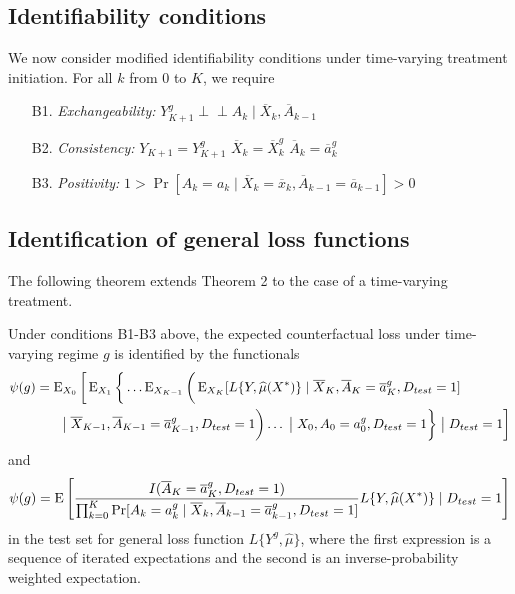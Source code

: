\subsection{Identifiability conditions}
We now consider modified identifiability conditions under time-varying treatment initiation. For all $k$ from 0 to $K$, we require
\begin{enumerate}
    \item[B1.] \textit{Exchangeability:} $Y^g_{K+1} \perp \!\!\! \perp A_k \mid \overline{X}_k, \overline{A}_{k-1}$
    \item[B2.] \textit{Consistency:} $Y_{K+1} = Y^g_{K+1}$ $\overline{X}_{k} = \overline{X}^g_{k}$  $\overline{A}_k = \overline{a}_k^g$
    \item[B3.] \textit{Positivity:} $1 > \Pr[A_k = a_k \mid \overline{X}_k = \overline{x}_k, \overline{A}_{k -1} = \overline{a}_{k-1}] > 0$
\end{enumerate}

\subsection{Identification of general loss functions}
The following theorem extends Theorem 2 to the case of a time-varying treatment. 
\begin{theorem}
    Under conditions B1-B3 above, the expected counterfactual loss under time-varying regime $g$ is identified by the functionals
    \begin{align}\label{eqn:cl_tv_estimand}
    \begin{split}
        \psi(g) &= \operatorname{E}_{X_0}\bigg[\operatorname{E}_{X_1}\bigg\{\ldots \operatorname{E}_{X_{K-1}}\bigg(\operatorname{E}_{X_{K}}[L\{Y, \widehat{\mu}(X^*)\} \mid \overline{X}_K, \overline{A}_K=\overline{a}^g_K, D_{test} = 1] \\
        & \qquad \big\vert\; \overline{X}_{K-1}, \overline{A}_{K-1}=\overline{a}^g_{K-1}, D_{test} = 1\bigg) \ldots \;\big\vert\; X_{0}, A_{0}=a^g_{0}, D_{test} = 1\bigg\}\;\big\vert\; D_{test} = 1\bigg]
    \end{split}
    \end{align}
and 
    \begin{equation}\label{eqn:ipw_tv_estimand}
        \psi(g) = \operatorname{E}\left[\frac{I(\overline{A}_K = \overline{a}^g_K, D_{test} = 1)}{\prod_{k=0}^K\Pr[A_k = a^g_k \mid \overline{X}_k, \overline{A}_{k-1} = \overline{a}^g_{k-1}, D_{test} = 1]}L\{Y, \widehat{\mu}(X^*)\} \mid D_{test} = 1\right]
    \end{equation}
in the test set for general loss function $L\{Y^{g}, \widehat{\mu}\}$, where the first expression is a sequence of iterated expectations and the second is an inverse-probability weighted expectation.
\end{theorem}

